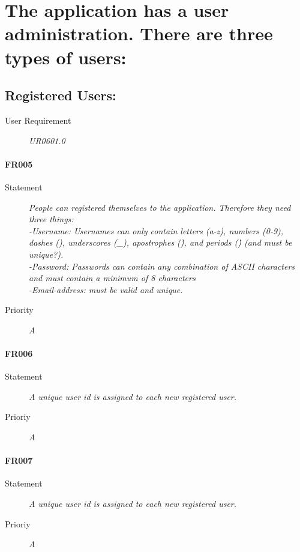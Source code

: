 \section{The application has a user administration. There are three types of users:}

\subsection{Registered Users:}

\begin{description}
\item[User Requirement] \textit{UR0601.0}
\end{description}

\paragraph{FR005}
\begin{description}
\item [Statement] \textit{
People can registered themselves to the application. Therefore they need three things: 
	\\-Username: Usernames can only contain letters (a-z), numbers (0-9), dashes (\-), underscores (\_), apostrophes (\'), and periods (\.) (and must be unique?).
	\\-Password: Passwords can contain any combination of ASCII characters and must contain a minimum of 8 characters
	\\-Email-address: must be valid and unique.
}
\item [Priority] \textit{A}
\end{description}

\paragraph{FR006}
\begin{description}
  \item [Statement]
    \textit{
    A unique user id is assigned to each new registered user.
}
  \item [Prioriy] \textit{A}
\end{description}

\paragraph{FR007}
\begin{description}
  \item [Statement]
    \textit{
    A unique user id is assigned to each new registered user.
}
  \item [Prioriy] \textit{A}
\end{description}

